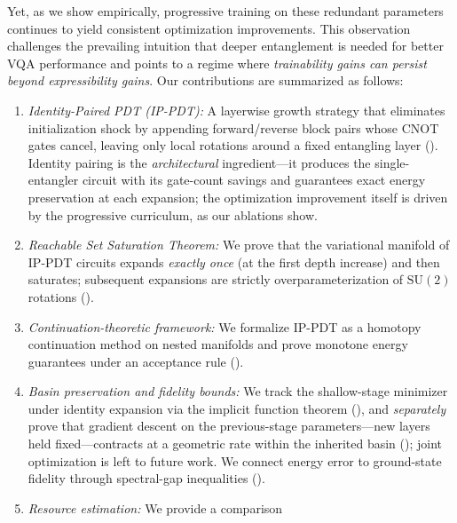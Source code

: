 \documentclass[11pt]{article}
\newcommand{\SU}{\mathrm{SU}}
\theoremstyle{plain}
\theoremstyle{plain}
\begin{document}
Yet, as we show empirically, progressive
training on these redundant parameters continues to yield consistent
optimization improvements.
This observation challenges the prevailing intuition that deeper
entanglement is needed for better VQA performance and points to a regime
where \emph{trainability gains can persist beyond expressibility
gains}.
Our contributions are summarized as follows:\vspace{-0.2cm}
\begin{enumerate}[leftmargin=*,itemsep=2pt]
  \item \textit{Identity-Paired PDT (IP-PDT):} A layerwise growth
    strategy that eliminates initialization shock by appending
    forward/reverse block pairs whose CNOT gates cancel, leaving only
    local rotations around a fixed entangling layer
    ().  Identity pairing is the \emph{architectural}
    ingredient---it produces the single-entangler circuit with its
    gate-count savings and guarantees exact energy preservation at each
    expansion; the optimization improvement itself is driven by the
    progressive curriculum, as our ablations show.\vspace{-0.1cm}
  \item \textit{Reachable Set Saturation Theorem:} We prove that the
    variational manifold of IP-PDT circuits expands \emph{exactly once}
    (at the first depth increase) and then saturates; subsequent
    expansions are strictly overparameterization of $\SU(2)$ rotations
    ().\vspace{-0.1cm}
  \item \textit{Continuation-theoretic framework:} We formalize IP-PDT
    as a homotopy continuation method on nested manifolds and prove
    monotone energy guarantees under an acceptance rule
    ().\vspace{-0.1cm}
  \item \textit{Basin preservation and fidelity bounds:} We track the
    shallow-stage minimizer under identity expansion via the implicit
    function theorem (), and \emph{separately}
    prove that gradient descent on the previous-stage parameters---new
    layers held fixed---contracts at a geometric rate
    within the inherited basin (); joint optimization is
    left to future work.  We connect energy error to ground-state
    fidelity through spectral-gap inequalities
    ().\vspace{-0.1cm}
  \item \textit{Resource estimation:} We provide a comparison

\end{enumerate}
\end{document}
